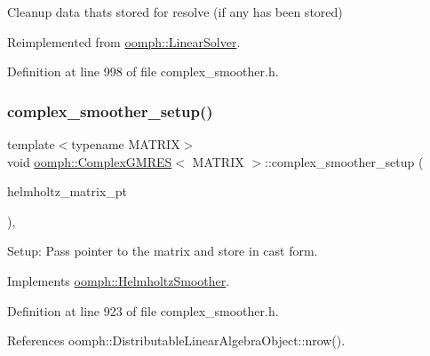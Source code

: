 Cleanup data that\textquotesingle{}s stored for resolve (if any has been stored) 



Reimplemented from \hyperlink{classoomph_1_1LinearSolver_a9d66f3262e80ca06a365f98216afd85f}{oomph\+::\+Linear\+Solver}.



Definition at line 998 of file complex\+\_\+smoother.\+h.

\mbox{\label{classoomph_1_1ComplexGMRES_a391b81dac92362f07b2cf80f3ba0821a}} 
\subsubsection{\texorpdfstring{complex\+\_\+smoother\+\_\+setup()}{complex\_smoother\_setup()}}
{\footnotesize\ttfamily template$<$typename M\+A\+T\+R\+IX$>$ \\
void \hyperlink{classoomph_1_1ComplexGMRES}{oomph\+::\+Complex\+G\+M\+R\+ES}$<$ M\+A\+T\+R\+IX $>$\+::complex\+\_\+smoother\+\_\+setup (\begin{DoxyParamCaption}\item[{\hyperlink{classoomph_1_1Vector}{Vector}$<$ \hyperlink{classoomph_1_1CRDoubleMatrix}{C\+R\+Double\+Matrix} $\ast$$>$}]{helmholtz\+\_\+matrix\+\_\+pt }\end{DoxyParamCaption})\hspace{0.3cm}{\ttfamily [inline]}, {\ttfamily [virtual]}}



Setup\+: Pass pointer to the matrix and store in cast form. 



Implements \hyperlink{classoomph_1_1HelmholtzSmoother_a7fffc8d9a93fa5ca0a3e21c972ea3c05}{oomph\+::\+Helmholtz\+Smoother}.



Definition at line 923 of file complex\+\_\+smoother.\+h.



References oomph\+::\+Distributable\+Linear\+Algebra\+Object\+::nrow().

\mbox{\label{classoomph_1_1ComplexGMRES_a874520bc44cd8127497d972373938df9}} 
